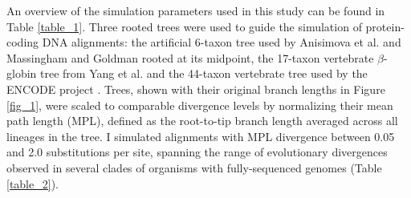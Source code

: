 An overview of the simulation parameters used in this study can be
found in Table \ref{table_1}. Three rooted trees were used to guide
the simulation of protein-coding DNA alignments: the artificial
6-taxon tree used by Anisimova et al.
\citeyearpar{Anisimova2001Accuracy} and Massingham and Goldman
\citeyearpar{Massingham2005Detecting} rooted at its midpoint, the
17-taxon vertebrate $\beta$-globin tree from Yang et
al. \citeyearpar{Yang2000CodonSubstitution} and the 44-taxon
vertebrate tree used by the ENCODE project
\citep{2007Identification,Nikolaev2007Early}. Trees, shown with their
original branch lengths in Figure \ref{fig_1}, were scaled to
comparable divergence levels by normalizing their mean path length
(MPL), defined as the root-to-tip branch length averaged across all
lineages in the tree. I simulated alignments with MPL divergence
between 0.05 and 2.0 \syn substitutions per \syn site,
spanning the range of evolutionary divergences observed in several
clades of organisms with fully-sequenced genomes (Table
\ref{table_2}).

